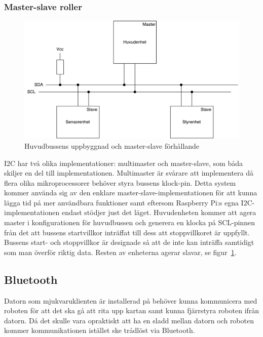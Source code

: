 \documentclass{article}
\begin{document}
\subsubsection{Master-slave roller}
\begin{figure}[H]
\centering 
\includegraphics[scale=0.56]{Huvudbuss}
\caption{Huvudbussens uppbyggnad och master-slave förhållande}
\label{fig:huvudbuss_masterslave}
\end{figure}

I2C har två olika implementationer: multimaster och master-slave, som båda skiljer en del till implementationen. Multimaster är svårare att implementera då flera olika mikroprocessorer behöver styra bussens klock-pin. Detta system kommer använda sig av den enklare master-slave-implementationen för att kunna lägga tid på mer användbara funktioner samt eftersom Raspberry Pi:s egna I2C-implementationen endast stödjer just det läget. Huvudenheten kommer att agera master i konfigurationen för huvudbussen och generera en klocka på SCL-pinnen från det att bussens startvillkor inträffat till dess att stoppvillkoret är uppfyllt. Bussens start- och stoppvillkor är designade så att de inte kan inträffa samtidigt som man överför riktig data. Resten av enheterna agerar slavar, se figur~\ref{fig:huvudbuss_masterslave}.


\subsection{Bluetooth}
Datorn som mjukvaruklienten är installerad på behöver kunna kommunicera med roboten för att det ska gå att rita upp kartan samt kunna fjärrstyra roboten ifrån datorn. Då det skulle vara opraktiskt att ha en sladd mellan datorn och roboten kommer kommunikationen istället ske trådlöst via Bluetooth. 
\end{document}
